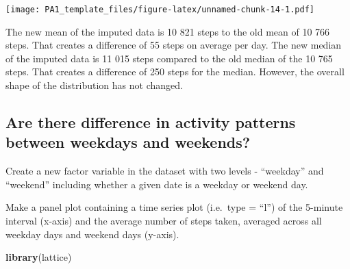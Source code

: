 \documentclass[]{article}
\newenvironment{Shaded}{\begin{snugshade}}{\end{snugshade}}
\newcommand{\KeywordTok}[1]{\textcolor[rgb]{0.13,0.29,0.53}{\textbf{#1}}}
\newcommand{\StringTok}[1]{\textcolor[rgb]{0.31,0.60,0.02}{#1}}
\newcommand{\OperatorTok}[1]{\textcolor[rgb]{0.81,0.36,0.00}{\textbf{#1}}}
\newcommand{\NormalTok}[1]{#1}
\begin{document}
\texttt{[image: PA1\_template\_files/figure-latex/unnamed-chunk-14-1.pdf]}

The new mean of the imputed data is 10 821 steps to the old mean of 10
766 steps. That creates a difference of 55 steps on average per day. The
new median of the imputed data is 11 015 steps compared to the old
median of the 10 765 steps. That creates a difference of 250 steps for
the median. However, the overall shape of the distribution has not
changed.

\subsection{Are there difference in activity patterns between weekdays
and
weekends?}\label{are-there-difference-in-activity-patterns-between-weekdays-and-weekends}

Create a new factor variable in the dataset with two levels -
``weekday'' and ``weekend'' including whether a given date is a weekday
or weekend day.

\begin{Shaded}
\end{Shaded}

Make a panel plot containing a time series plot (i.e.~type = ``l'') of
the 5-minute interval (x-axis) and the average number of steps taken,
averaged across all weekday days and weekend days (y-axis).

\begin{Shaded}
\begin{Highlighting}[]
\KeywordTok{library}\NormalTok{(lattice)}
\end{Highlighting}
\end{Shaded}
\end{document}
